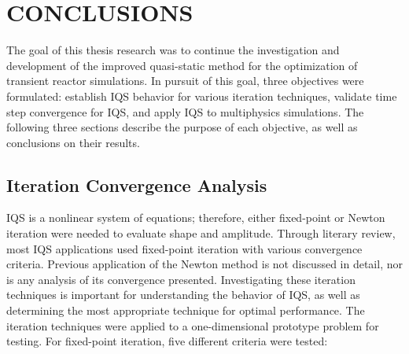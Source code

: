 %
%
%


\chapter{\uppercase{Conclusions}}

The goal of this thesis research was to continue the investigation and development of the improved quasi-static method for the optimization of transient reactor simulations. In pursuit of this goal, three objectives were formulated: establish IQS behavior for various iteration techniques, validate time step convergence for IQS, and apply IQS to multiphysics simulations. The following three sections describe the purpose of each objective, as well as conclusions on their results. 

\section{Iteration Convergence Analysis}

IQS is a nonlinear system of equations; therefore, either fixed-point or Newton iteration were needed to evaluate shape and amplitude. Through literary review, most IQS applications used fixed-point iteration with various convergence criteria. Previous application of the Newton method is not discussed in detail, nor is any analysis of its convergence presented. Investigating these iteration techniques is important for understanding the behavior of IQS, as well as determining the most appropriate technique for optimal performance. The iteration techniques were applied to a one-dimensional prototype problem for testing. For fixed-point iteration, five different criteria were tested: 

